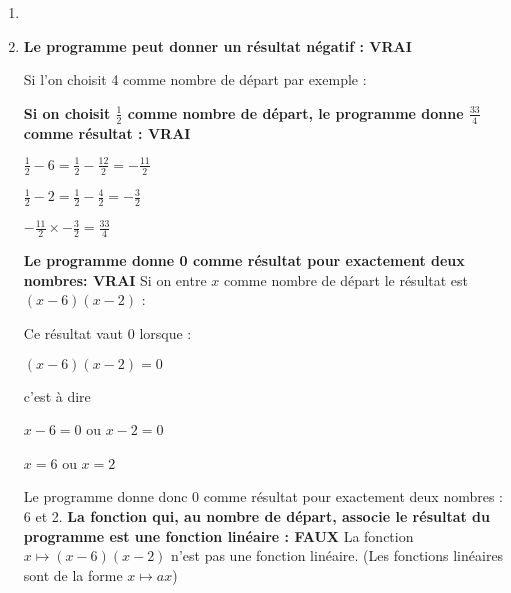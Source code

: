 \begin{corrige}
     \begin{enumerate}
          \item
\begin{center}
\end{center}
          \item
          \textbf{Le programme peut donner un résultat négatif : VRAI}
\par
          Si l'on choisit 4 comme nombre de départ par exemple :
\begin{center}
\end{center}
          \textbf{Si on choisit $\frac{1}{2}$ comme nombre de départ, le programme donne $\frac{33}{4}$ comme résultat : VRAI}
\par
          $\frac{1}{2}-6=\frac{1}{2}-\frac{12}{2}=-\frac{11}{2}$
          \par
          $\frac{1}{2}-2=\frac{1}{2}-\frac{4}{2}=-\frac{3}{2}$
          \par
          $-\frac{11}{2}\times -\frac{3}{2}=\frac{33}{4}$

\begin{center}
\end{center}
          \textbf{Le programme donne 0 comme résultat pour exactement deux nombres: VRAI}
          Si on entre $x$ comme nombre de départ le résultat est $\left(x-6\right)\left(x-2\right)$ :

\begin{center}
\end{center}
          Ce résultat vaut $0$ lorsque :
          \par
          $\left(x-6\right)\left(x-2\right)=0$
          \par
          c'est à dire
          \par
          $x-6=0$ ou $x-2=0$
          \par
          $x=6$ ou $x=2$
          \par
          Le programme donne  donc 0 comme résultat pour exactement deux nombres : 6 et 2.
          \textbf{La fonction qui, au nombre de départ, associe le résultat du programme est une fonction linéaire : FAUX}
          La fonction $x\mapsto \left(x-6\right)\left(x-2\right)$ n'est pas une fonction linéaire. (Les fonctions linéaires sont de la forme $x\mapsto ax$)
     \end{enumerate}
\end{corrige}
